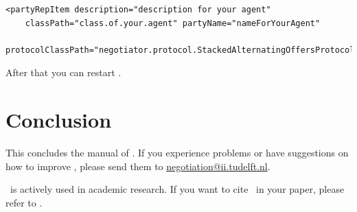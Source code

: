 \documentclass[]{article}
\begin{document}
\begin{lstlisting}
<partyRepItem description="description for your agent"
	classPath="class.of.your.agent" partyName="nameForYourAgent"
	protocolClassPath="negotiator.protocol.StackedAlternatingOffersProtocol"/>
\end{lstlisting}

After that you can restart \Genius .

\section{Conclusion}
This concludes the manual of \Genius. If you experience problems or have suggestions on how to improve \Genius, please send them to \url{negotiation@ii.tudelft.nl}. 

\Genius\ is actively used in academic research. If you want to cite \Genius\ in your paper, please refer to \cite{Genius}.




\end{document}
